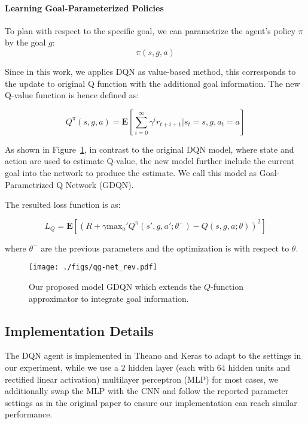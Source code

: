 \paragraph{Learning Goal-Parameterized Policies}
To plan with respect to the specific goal, we can parametrize the agent's policy $\pi$ by the goal $g$: 
\begin{equation}
    \pi(s,g,a)
\end{equation}

Since in this work, we applies DQN as value-based method, this corresponds to the update to original Q function with the additional goal information. The new Q-value function is hence defined as:

\begin{equation}
    Q^\pi(s,g,a) = \mathbf{E}[\sum\limits_{i=0}^\infty \gamma^i r_{t+i+1}|s_t=s,g,a_t=a]
\end{equation}

As shown in Figure~\ref{fig:goal_net}, in contrast to the original DQN model, where state and action are used to estimate Q-value,  the new model further include the current goal into the network to produce the estimate. We call this model as Goal-Parametrized Q Network (GDQN). 

The resulted loss function is as:

\begin{equation}
    L_Q = \mathbf{E}[(R + \gamma \text{max}_a' Q^\pi(s',g,a';\theta^-) - Q(s,g,a;\theta))^2 ]
\end{equation}

where $\theta^-$ are the previous parameters and the optimization is with respect to $\theta$. 

\begin{figure}[h]
\centering
\texttt{[image: ./figs/qg-net\_rev.pdf]}
\caption{Our proposed model GDQN which extends the $Q$-function approximator to integrate goal information.}
\label{fig:goal_net}
\end{figure}

\subsection{Implementation Details}
The DQN agent is implemented in Theano and Keras to adapt to the settings in our experiment, while we use a $2$ hidden layer (each with $64$ hidden units and rectified linear activation) multilayer perceptron (MLP) for most cases, we additionally swap the MLP with the CNN and follow the reported parameter settings as in the original paper \citep{mnih2015human} to ensure our implementation can reach similar performance.

